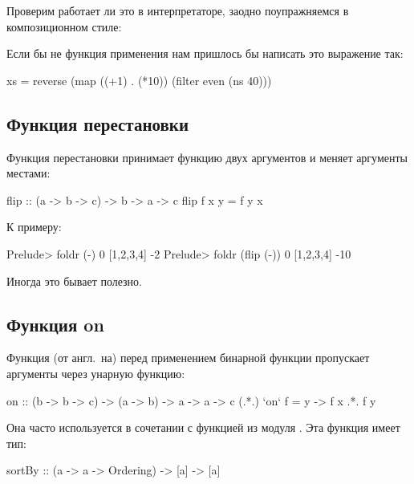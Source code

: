 Проверим работает ли это в интерпретаторе, заодно поупражняемся
в композиционном стиле:


Если бы не функция применения нам пришлось бы написать 
это выражение так:

\begin{code}
xs = reverse (map ((+1) . (*10)) (filter even (ns 40)))
\end{code}

\subsection{Функция перестановки}

Функция перестановки  принимает функцию
двух аргументов и меняет аргументы местами:

\begin{code}
flip  :: (a -> b -> c) -> b -> a -> c
flip f x y = f y x
\end{code}

К примеру:

\begin{code}
Prelude> foldr (-) 0 [1,2,3,4]
-2
Prelude> foldr (flip (-)) 0 [1,2,3,4]
-10
\end{code}

Иногда это бывает полезно.

\subsection{Функция on}

Функция  (от англ.~на) перед применением бинарной
функции пропускает аргументы через унарную функцию:

\begin{code}
on :: (b -> b -> c) -> (a -> b) -> a -> a -> c
(.*.) `on` f = \x y -> f x .*. f y
\end{code}

Она часто используется в сочетании с функцией 
из модуля . Эта функция имеет тип:

\begin{code}
sortBy :: (a -> a -> Ordering) -> [a] -> [a]
\end{code}

